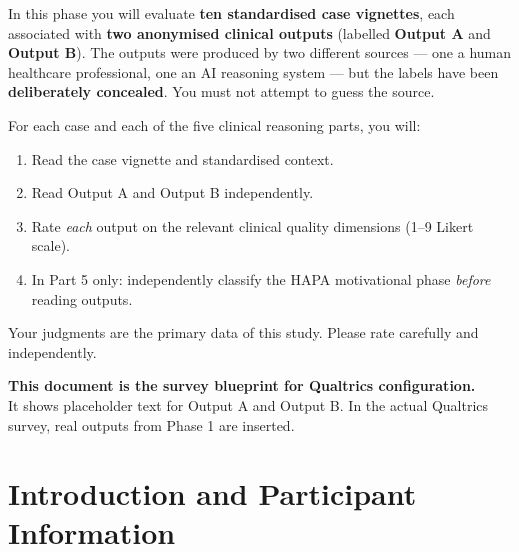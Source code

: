 \documentclass[11pt,a4paper]{article}
\begin{document}
\begin{titlepage}
\begin{tcolorbox}[
  colback=AccentRed,colframe=RichPurple,
  arc=2mm,left=10pt,right=10pt,top=9pt,bottom=9pt,
  width=0.88\textwidth
]
\medskip\small
In this phase you will evaluate \textbf{ten standardised case vignettes}, each associated with \textbf{two anonymised clinical outputs} (labelled \textbf{Output A} and \textbf{Output B}). The outputs were produced by two different sources --- one a human healthcare professional, one an AI reasoning system --- but the labels have been \textbf{deliberately concealed}. You must not attempt to guess the source.

\medskip
For each case and each of the five clinical reasoning parts, you will:
\begin{enumerate}[topsep=3pt,itemsep=2pt]
\item Read the case vignette and standardised context.
\item Read Output A and Output B independently.
\item Rate \emph{each} output on the relevant clinical quality dimensions (1--9 Likert scale).
\item In Part 5 only: independently classify the HAPA motivational phase \emph{before} reading outputs.
\end{enumerate}

\medskip
Your judgments are the primary data of this study. Please rate carefully and independently.
\end{tcolorbox}

\vfill

\begin{tcolorbox}[
  colback=SoftBG,colframe=BorderGrey,
  arc=1.5mm,left=8pt,right=8pt,top=7pt,bottom=7pt,
  width=0.82\textwidth
]
\centering\small
\textbf{This document is the survey blueprint for Qualtrics configuration.}\\
It shows placeholder text for Output A and Output B. In the actual Qualtrics survey, real outputs from Phase 1 are inserted.
\end{tcolorbox}

\vspace{0.4cm}{\large\today}
\end{titlepage}

\newpage
\tableofcontents
\newpage

\section{Introduction and Participant Information}
\end{document}
